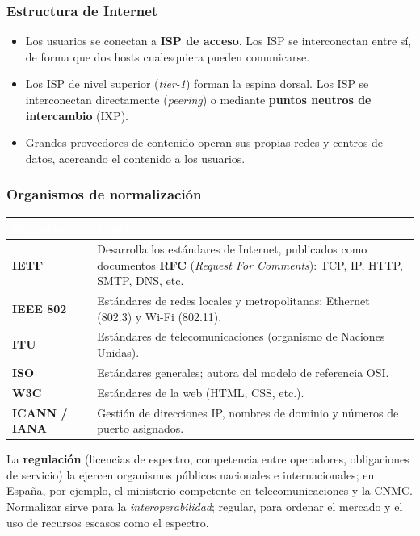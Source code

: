 \documentclass[11pt,a4paper]{article}
\newcommand{\hd}[1]{\cellcolor{uahblue}\textcolor{white}{\textbf{#1}}}
\begin{document}
\subsubsection{Estructura de Internet}
\begin{itemize}
  \item Los usuarios se conectan a \textbf{ISP de acceso}. Los ISP se interconectan entre sí, de forma que dos hosts cualesquiera pueden comunicarse.
  \item Los ISP de nivel superior (\emph{tier-1}) forman la espina dorsal. Los ISP se interconectan directamente (\emph{peering}) o mediante \textbf{puntos neutros de intercambio} (IXP).
  \item Grandes proveedores de contenido operan sus propias redes y centros de datos, acercando el contenido a los usuarios.
\end{itemize}

\subsubsection{Organismos de normalización}

\begin{tabularx}{\textwidth}{@{}L{3.2cm}X@{}}
\toprule
\hd{Organismo} & \hd{Papel} \\
\midrule
\textbf{IETF} & Desarrolla los estándares de Internet, publicados como documentos \textbf{RFC} (\emph{Request For Comments}): TCP, IP, HTTP, SMTP, DNS, etc. \\
\textbf{IEEE 802} & Estándares de redes locales y metropolitanas: Ethernet (802.3) y Wi-Fi (802.11). \\
\textbf{ITU} & Estándares de telecomunicaciones (organismo de Naciones Unidas). \\
\textbf{ISO} & Estándares generales; autora del modelo de referencia OSI. \\
\textbf{W3C} & Estándares de la web (HTML, CSS, etc.). \\
\textbf{ICANN / IANA} & Gestión de direcciones IP, nombres de dominio y números de puerto asignados. \\
\bottomrule
\end{tabularx}

La \textbf{regulación} (licencias de espectro, competencia entre operadores, obligaciones de servicio) la ejercen organismos públicos nacionales e internacionales; en España, por ejemplo, el ministerio competente en telecomunicaciones y la CNMC. Normalizar sirve para la \emph{interoperabilidad}; regular, para ordenar el mercado y el uso de recursos escasos como el espectro.
\end{document}
